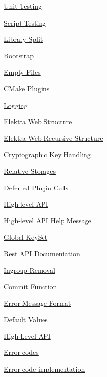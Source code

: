 \begin{DoxyItemize}
\item \hyperlink{doc_decisions_unit_testing_md}{Unit Testing}
\item \hyperlink{doc_decisions_script_testing_md}{Script Testing}
\item \hyperlink{doc_decisions_library_split_md}{Library Split}
\item \hyperlink{doc_decisions_bootstrap_md}{Bootstrap}
\item \hyperlink{doc_decisions_empty_files_md}{Empty Files}
\item \hyperlink{doc_decisions_cmake_plugins_md}{C\+Make Plugins}
\item \hyperlink{doc_decisions_logging_md}{Logging}
\item \hyperlink{doc_decisions_elektra_web_md}{Elektra Web Structure}
\item \hyperlink{doc_decisions_elektra_web_recursive_md}{Elektra Web Recursive Structure}
\item \hyperlink{doc_decisions_cryptograhic_key_handling_md}{Cryptographic Key Handling}
\item \hyperlink{doc_decisions_relative_md}{Relative Storages}
\item \hyperlink{doc_decisions_deferred_plugin_calls_md}{Deferred Plugin Calls}
\item \hyperlink{doc_decisions_high_level_api_md}{High-\/level A\+PI}
\item \hyperlink{doc_decisions_highlevel_help_message_md}{High-\/level A\+PI Help Message}
\item \hyperlink{doc_decisions_global_keyset_md}{Global Key\+Set}
\item \hyperlink{doc_decisions_rest_api_documentation_md}{Rest A\+PI Documentation}
\item \hyperlink{doc_decisions_ingroup_removal_md}{Ingroup Removal}
\item \hyperlink{doc_decisions_commit_function_md}{Commit Function}
\item \hyperlink{doc_decisions_error_message_format_md}{Error Message Format}
\item \hyperlink{doc_decisions_default_values_md}{Default Values}
\item \hyperlink{doc_decisions_high_level_api_md}{High Level A\+PI}
\item \hyperlink{doc_decisions_error_codes_md}{Error codes}
\item \hyperlink{doc_decisions_error_code_implementation_md}{Error code implementation}
\end{DoxyItemize}


